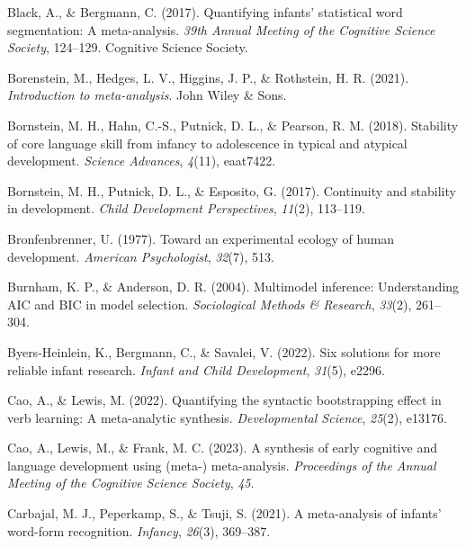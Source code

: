 \documentclass[
  man]{apa6}
\newlength{\cslhangindent}
\newlength{\cslentryspacingunit} %
\newenvironment{CSLReferences}[2] %
 {%
  \setlength{\parindent}{0pt}
  \ifodd #1
  \let\oldpar\par
  \def\par{\hangindent=\cslhangindent\oldpar}
  \fi
  \setlength{\parskip}{#2\cslentryspacingunit}
 }%
 {}
\begin{document}
\begin{CSLReferences}{1}{0}
\leavevmode{}%
Black, A., \& Bergmann, C. (2017). Quantifying infants' statistical word segmentation: A meta-analysis. \emph{39th Annual Meeting of the Cognitive Science Society}, 124--129. Cognitive Science Society.

\leavevmode{}%
Borenstein, M., Hedges, L. V., Higgins, J. P., \& Rothstein, H. R. (2021). \emph{Introduction to meta-analysis}. John Wiley \& Sons.

\leavevmode{}%
Bornstein, M. H., Hahn, C.-S., Putnick, D. L., \& Pearson, R. M. (2018). Stability of core language skill from infancy to adolescence in typical and atypical development. \emph{Science Advances}, \emph{4}(11), eaat7422.

\leavevmode{}%
Bornstein, M. H., Putnick, D. L., \& Esposito, G. (2017). Continuity and stability in development. \emph{Child Development Perspectives}, \emph{11}(2), 113--119.

\leavevmode{}%
Bronfenbrenner, U. (1977). Toward an experimental ecology of human development. \emph{American Psychologist}, \emph{32}(7), 513.

\leavevmode{}%
Burnham, K. P., \& Anderson, D. R. (2004). Multimodel inference: Understanding AIC and BIC in model selection. \emph{Sociological Methods \& Research}, \emph{33}(2), 261--304.

\leavevmode{}%
Byers-Heinlein, K., Bergmann, C., \& Savalei, V. (2022). Six solutions for more reliable infant research. \emph{Infant and Child Development}, \emph{31}(5), e2296.

\leavevmode{}%
Cao, A., \& Lewis, M. (2022). Quantifying the syntactic bootstrapping effect in verb learning: A meta-analytic synthesis. \emph{Developmental Science}, \emph{25}(2), e13176.

\leavevmode{}%
Cao, A., Lewis, M., \& Frank, M. C. (2023). A synthesis of early cognitive and language development using (meta-) meta-analysis. \emph{Proceedings of the Annual Meeting of the Cognitive Science Society}, \emph{45}.

\leavevmode{}%
Carbajal, M. J., Peperkamp, S., \& Tsuji, S. (2021). A meta-analysis of infants' word-form recognition. \emph{Infancy}, \emph{26}(3), 369--387.


\end{CSLReferences}
\end{document}
